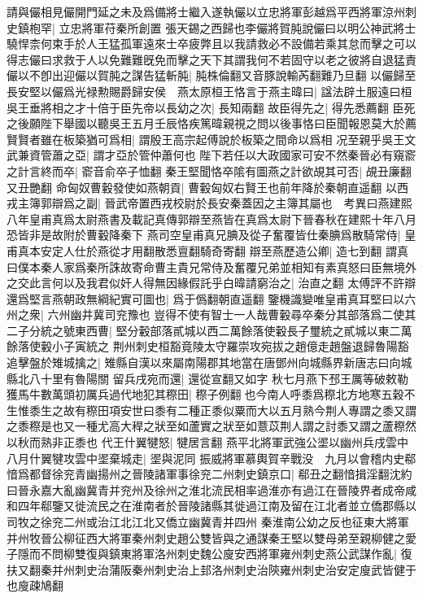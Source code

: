 請與儼相見儼開門延之未及爲備將士繼入遂執儼以立忠將軍彭越爲平西將軍涼州刺史鎮枹罕|{
	立忠將軍苻秦所創置}
張天錫之西歸也李儼將賀肫說儼曰以明公神武將士驍悍柰何束手於人王猛孤軍遠來士卒疲弊且以我請救必不設備若乘其怠而擊之可以得志儼曰求救于人以免難難旣免而擊之天下其謂我何不若固守以老之彼將自退猛責儼以不卽出迎儼以賀肫之謀告猛斬肫|{
	肫株倫翻又音豚說輸芮翻難乃旦翻}
以儼歸至長安堅以儼爲光禄勲賜爵歸安侯　燕太原桓王恪言于燕主暐曰|{
	諡法辟土服遠曰桓}
吳王垂將相之才十倍于臣先帝以長幼之次|{
	長知兩翻}
故臣得先之|{
	得先悉薦翻}
臣死之後願陛下舉國以聽吳王五月壬辰恪疾篤暐親視之問以後事恪曰臣聞報恩莫大於薦賢賢者雖在板築猶可爲相|{
	謂殷王高宗起傅說於板築之間命以爲相}
况至親乎吳王文武兼資管蕭之亞|{
	謂才亞於管仲蕭何也}
陛下若任以大政國家可安不然秦晉必有窺窬之計言終而卒|{
	窬音俞卒子恤翻}
秦王堅聞恪卒隂有圖燕之計欲覘其可否|{
	覘丑廉翻又丑艷翻}
命匈奴曹轂發使如燕朝貢|{
	曹轂匈奴右賢王也前年降於秦朝直遥翻}
以西戎主簿郭辯爲之副|{
	晉武帝置西戎校尉於長安秦蓋因之主簿其屬也　考異曰燕建熙八年皇甫真爲太尉燕書及載記真傳郭辯至燕皆在真爲太尉下晉春秋在建熙十年八月恐皆非是故附於曹轂降秦下}
燕司空皇甫真兄腆及從子奮覆皆仕秦腆爲散騎常侍|{
	皇甫真本安定人仕於燕從才用翻散悉亶翻騎奇寄翻}
辯至燕歷造公卿|{
	造七到翻}
謂真曰僕本秦人家爲秦所誅故寄命曹主貴兄常侍及奮覆兄弟並相知有素真怒曰臣無境外之交此言何以及我君似奸人得無因緣假託乎白暐請窮治之|{
	治直之翻}
太傅評不許辯還爲堅言燕朝政無綱紀實可圖也|{
	爲于僞翻朝直遥翻}
鑒機識變唯皇甫真耳堅曰以六州之衆|{
	六州幽井冀司兖豫也}
豈得不使有智士一人哉曹轂尋卒秦分其部落爲二使其二子分統之號東西曹|{
	堅分轂部落貳城以西二萬餘落使轂長子璽統之貳城以東二萬餘落使轂小子寅統之}
荆州刺史桓豁竟陵太守羅崇攻宛拔之趙億走趙盤退歸魯陽豁追擊盤於雉城擒之|{
	雉縣自漢以來屬南陽郡其地當在唐鄧州向城縣界新唐志曰向城縣北八十里有魯陽關}
留兵戌宛而還|{
	還從宣翻又如字}
秋七月燕下邳王厲等破敕勒獲馬牛數萬頭初厲兵過代地犯其穄田|{
	穄子例翻也今南人呼黍爲穄北方地寒五穀不生惟黍生之故有穄田項安世曰黍有二種正黍似粟而大以五月熟今荆人專謂之黍又謂之黍穄是也又一種尤高大稈之狀至如蘆實之狀至如薏苡荆人謂之討黍又謂之蘆穄然以秋而熟非正黍也}
代王什翼犍怒|{
	犍居言翻}
燕平北將軍武強公埿以幽州兵戌雲中八月什翼犍攻雲中埿棄城走|{
	埿與泥同}
振威將軍慕輿賀辛戰没　九月以會稽内史郗愔爲都督徐兖青幽揚州之晉陵諸軍事徐兖二州刺史鎮京口|{
	郗丑之翻愔揖淫翻沈約曰晉永嘉大亂幽冀青并兖州及徐州之淮北流民相率過淮亦有過江在晉陵界者成帝咸和四年郗鑒又徙流民之在淮南者於晉陵諸縣其徙過江南及留在江北者並立僑郡縣以司牧之徐兖二州或治江北江北又僑立幽冀青并四州}
秦淮南公幼之反也征東大將軍并州牧晉公柳征西大將軍秦州刺史趙公雙皆與之通謀秦王堅以雙母弟至親柳健之愛子隱而不問柳雙復與鎮東將軍洛州刺史魏公廋安西將軍雍州刺史燕公武謀作亂|{
	復扶又翻秦并州刺史治蒲阪秦州刺史治上邽洛州刺史治陝雍州刺史治安定廋武皆健于也廋疎鳩翻}

